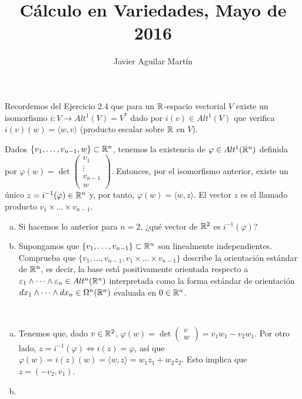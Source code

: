 \documentclass[twoside]{article}
\begin{document}
\title{Cálculo en Variedades, Mayo de 2016}
\author{Javier Aguilar Martín}
\maketitle


\begin{ejercicio}{1}
Recordemos del Ejercicio 2.4 que para un $\mathbb{R}$-espacio vectorial $V$ existe un isomorfismo $i:V\to Alt^1(V)=V^*$ dado por $i(v)\in Alt^1(V)$ que verifica $i(v)(w)=\langle w, v\rangle$ (producto escalar sobre $\mathbb{R}$ en $V$). 

Dados $\{v_1,\dots, v_{n-1},w\}\subset\mathbb{R}^n$, tenemos la existencia de $\varphi\in Alt^1(\mathbb{R}^n)$ definida por $\varphi(w)=\det\begin{pmatrix}
v_1\\
\vdots\\
v_{n-1}\\
w
\end{pmatrix}$. Entonces, por el isomorfismo anterior, existe un único $z=i^{-1}(\varphi)\in\mathbb{R}^n$ y, por tanto, $\varphi(w)=\langle w,z\rangle$. El vector $z$ es el llamado producto $v_1\times\dots\times v_{n-1}$.
\begin{enumerate}[a)]
\item Si hacemos lo anterior para $n=2$, ¿qué vector de $\mathbb{R}^2$ es $i^{-1}(\varphi)$?
\item Supongamos que $\{v_1,\dots, v_{n-1}\}\subset\mathbb{R}^n$ son linealmente independientes. Comprueba que $\{v_1,\dots, v_{n-1}, v_1\times\dots\times v_{n-1}\}$ describe la orientación estándar de $\mathbb{R}^n$, es decir, la base está positivamente orientada respecto a $\varepsilon_1\land\dots\land\varepsilon_n\in Alt^n(\mathbb{R}^n)$ interpretada como la forma estándar de orientación $dx_1\land\dots\land dx_n\in\Omega^n(\mathbb{R}^n)$ evaluada en $0\in\mathbb{R}^n$.
\end{enumerate}
\end{ejercicio}
\begin{solucion}\
\begin{enumerate}[a)]
\item  Tenemos que, dado $v\in\mathbb{R}^2$,  $\varphi(w)=\det\begin{pmatrix}
v\\
w
\end{pmatrix}=v_1w_1-v_2w_1$. Por otro lado, $z=i^{-1}(\varphi)\Leftrightarrow i(z)=\varphi$, así que $\varphi(w)=i(z)(w)=\langle w,z\rangle =w_1z_1+w_2z_2$. Esto implica que $z=(-v_2,v_1)$. 
\item
\end{enumerate}

\end{solucion}
\end{document}
